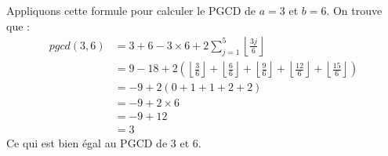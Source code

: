 \documentclass[11pt,a4paper]{article}
\begin{document}
Appliquons cette formule pour calculer le PGCD de $a=3$ et $b=6$. On trouve que :
\begin{align*}pgcd(3,6) &= 3 + 6 - 3 \times 6 + 2 \sum _{j=1}^{5} \left\lfloor \frac{3j}{6} \right\rfloor \\
&= 9 - 18 + 2 \left( \left\lfloor \frac{3}{6} \right\rfloor + \left\lfloor \frac{6}{6} \right\rfloor + \left\lfloor \frac{9}{6} \right\rfloor + \left\lfloor \frac{12}{6} \right\rfloor + \left\lfloor \frac{15}{6} \right\rfloor \right) \\
&= -9 + 2 \left( 0 + 1 + 1 + 2 + 2 \right) \\
&= -9 + 2 \times 6 \\
&= -9 + 12 \\
&= 3\end{align*}
Ce qui est bien égal au PGCD de $3$ et $6$.
\end{document}
